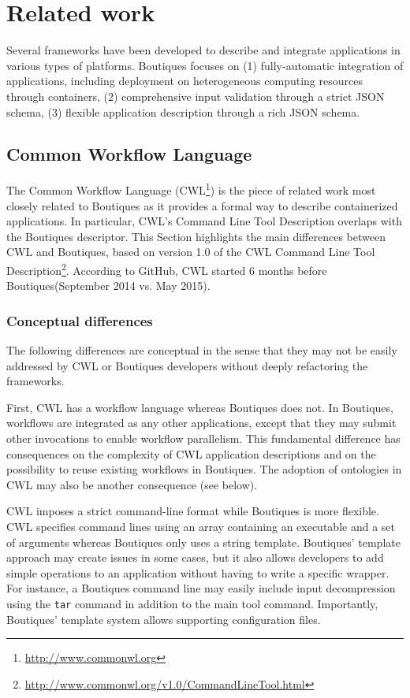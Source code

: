 \documentclass[a4paper,num-refs]{oup-contemporary}
\newcommand{\boutiques}{Boutiques\xspace}
\begin{document}

\section{Related work}

Several frameworks have been developed to describe and integrate
applications in various types of platforms. \boutiques focuses on (1)
fully-automatic integration of applications, including deployment on
heterogeneous computing resources through containers, (2)
comprehensive input validation through a strict JSON schema, (3)
flexible application description through a rich JSON
schema.

\subsection{Common Workflow Language}

The Common Workflow Language
(CWL\footnote{\url{http://www.commonwl.org}}) is the piece of related
work most closely related to \boutiques as it provides a formal way to
describe containerized applications. In particular, CWL's Command Line
Tool Description overlaps with the \boutiques descriptor. This Section
highlights the main differences between CWL and \boutiques, based on
version 1.0 of the CWL Command Line Tool
Description\footnote{\url{http://www.commonwl.org/v1.0/CommandLineTool.html}}. According
to GitHub, CWL started 6 months before \boutiques (September 2014
vs. May 2015).

\subsubsection{Conceptual differences}

The following differences are conceptual in the sense that they may
not be easily addressed by CWL or \boutiques developers without deeply
refactoring the frameworks.

First, CWL has a workflow language whereas \boutiques does not. In
\boutiques, workflows are integrated as any other applications, except
that they may submit other invocations to enable workflow
parallelism. This fundamental difference has consequences on the
complexity of CWL application descriptions and on the possibility to
reuse existing workflows in \boutiques. The adoption of ontologies in
CWL may also be another consequence (see below).

CWL imposes a strict command-line format while \boutiques is more
flexible. CWL specifies command lines using an array containing an
executable and a set of arguments whereas \boutiques only uses a
string template. \boutiques' template approach may create issues in
some cases, but it also allows developers to add simple operations to
an application without having to write a specific wrapper. For
instance, a \boutiques command line may easily include input
decompression using the \texttt{tar} command in addition to the main
tool command. Importantly, \boutiques' template system allows
supporting configuration files.
\end{document}

